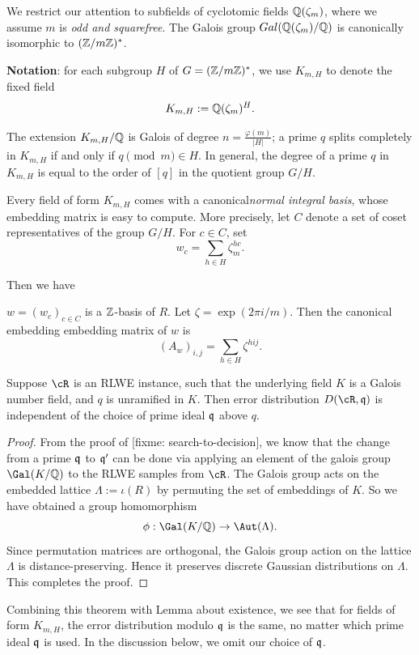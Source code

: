 \documentclass{amsart}
\begin{document}
We restrict our attention to subfields of cyclotomic fields $\mathbb{Q}(\zeta_m)$, where we assume $m$ is {\it odd and squarefree}. The Galois group $Gal(\mathbb{Q}(\zeta_m)/\mathbb{Q})$ is canonically isomorphic to $(\mathbb{Z}/m\mathbb{Z})^*$.

{\bf Notation}: for each subgroup $H$ of $G = (\mathbb{Z}/m\mathbb{Z})^*$, we use $K_{m,H}$ to denote the fixed field
\[
    K_{m,H} := \mathbb{Q}(\zeta_m)^H.
\]

The extension $K_{m,H}/\mathbb{Q}$ is Galois of degree $n = \frac{\varphi(m)}{|H|}$; a prime $q$ splits completely in $K_{m,H}$ if and only if $q \pmod{m} \in H$. In general, the degree of a prime $q$ in $K_{m,H}$ is equal to the order of $[q]$ in the quotient group $G/H$.



Every field of form $K_{m,H}$ comes with a canonical{\it normal integral basis}, whose embedding matrix is easy to compute. More precisely, let $C$ denote a set of coset representatives of the group $G/H$. For $c \in C$, set
\[
    w_c =  \sum_{h \in H} \zeta_m^{hc}.
\]

Then we have
\begin{Prop}
$w = (w_c)_{c \in C}$ is a $\mathbb{Z}$-basis of $R$. Let $\zeta = \exp(2\pi i /m)$. Then the canonical embedding embedding matrix of $w$ is
\[
    (A_w)_{i,j} = \sum_{h \in H}{\zeta^{hij}}.
\]
\end{Prop}
\begin{Prop}
Suppose $\cR$ is an RLWE instance, such that the underlying field $K$ is a Galois number field, and $q$ is unramified in $K$. Then error distribution $D(\cR, \fq)$ is independent of the choice of prime ideal $\mathfrak{q}$ above $q$.
\end{Prop}

\begin{proof}
From the proof of [fixme: search-to-decision], we know that the change from a prime $\mathfrak{q}$ to $\mathfrak{q}'$ can be done via applying an element of the galois group $\Gal(K/\bQ)$ to the RLWE samples from $\cR$. The Galois group acts on the embedded lattice $\Lambda := \iota(R)$ by permuting the set of embeddings of $K$. So we have obtained a group homomorphism $$\phi: \Gal(K/\bQ) \to \Aut(\Lambda).$$
Since permutation matrices are orthogonal, the Galois group action on the lattice $\Lambda$ is distance-preserving. Hence it preserves discrete Gaussian distributions on $\Lambda$. This completes the proof.
\end{proof}

Combining this theorem with Lemma about existence, we see that for fields of form $K_{m,H}$, the error distribution modulo $\mathfrak{q}$ is the same, no matter which prime ideal $\mathfrak{q}$ is used. In the discussion below, we omit our choice of $\mathfrak{q}$.
\end{document}
